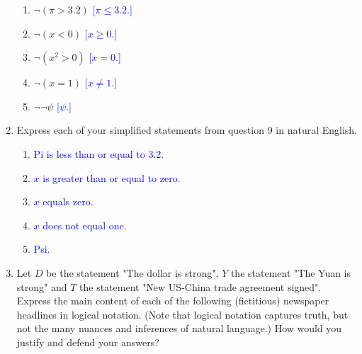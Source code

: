 \documentclass[13.5pt]{article}
\begin{document}
\begin{enumerate}
\begin{enumerate} 
  \item{\(\neg(\pi>3.2)\)}    \textcolor{blue}{[\(\pi\leq3.2\).]}
  \item{\(\neg(x<0)\)}   \textcolor{blue}{[\(x\geq0\).]}
  \item{\(\neg(x^2>0)\)}   \textcolor{blue}{[\(x=0\).]} 
  \item{\(\neg(x=1)\)}   \textcolor{blue}{[\(x\neq1\).]} 
  \item{\(\neg \neg \psi\)}   \textcolor{blue}{[\(\psi\).]} 
\end{enumerate}

\item{Express each of your simplified statements from question 9 in natural English.}

\begin{enumerate}
\item \textcolor{blue}{Pi is less than or equal to 3.2.}
\item \textcolor{blue}{\(x\) is greater than or equal to zero.}
\item \textcolor{blue}{\(x\) equals zero.}
\item \textcolor{blue}{\(x\) does not equal one.}
\item \textcolor{blue}{Psi.}
\end{enumerate}

\item{Let \(D\) be the statement "The dollar is strong", \(Y\) the statement "The Yuan is strong" and \(T\) the statement "New US-China trade agreement signed". Express the main content of each of the following (fictitious) newspaper headlines in logical notation. (Note that logical notation captures truth, but not the many nuances and inferences of natural language.) How would you justify and defend your answers?}


\end{enumerate}
\end{document}
